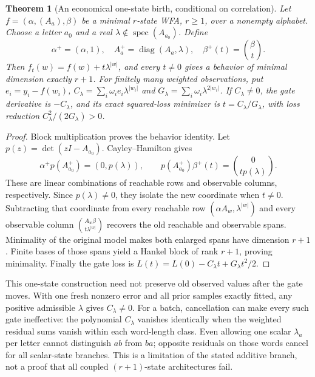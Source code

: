 \documentclass[11pt]{article}
\newtheorem{theorem}{Theorem}[section]
\theoremstyle{definition}
\theoremstyle{remark}
\begin{document}
\begin{theorem}[An economical one-state birth, conditional on correlation]
\label{ce:one-state}
Let $f=(\alpha,(A_a),\beta)$ be a minimal $r$-state WFA, $r\geq1$,
over a nonempty alphabet. Choose a letter $a_0$ and a real
$\lambda\notin\operatorname{spec}(A_{a_0})$. Define
\[
 \alpha^+=(\alpha,1),\quad
 A_a^+=\operatorname{diag}(A_a,\lambda),\quad
 \beta^+(t)=\binom\beta t.
\]
Then $f_t(w)=f(w)+t\lambda^{|w|}$, and every $t\ne0$ gives a behavior
of minimal dimension exactly $r+1$. For finitely many weighted observations,
put $e_i=y_i-f(w_i)$,
$C_\lambda=\sum_i\omega_i e_i\lambda^{|w_i|}$ and
$G_\lambda=\sum_i\omega_i\lambda^{2|w_i|}$. If $C_\lambda\ne0$,
the gate derivative is $-C_\lambda$, and its exact squared-loss minimizer
is $t=C_\lambda/G_\lambda$, with loss reduction
$C_\lambda^2/(2G_\lambda)>0$.
\end{theorem}
\begin{proof}
Block multiplication proves the behavior identity. Let
$p(z)=\det(zI-A_{a_0})$. Cayley--Hamilton gives
\[
 \alpha^+p(A_{a_0}^+)=(0,p(\lambda)),\qquad
 p(A_{a_0}^+)\beta^+(t)=\binom0{t p(\lambda)}.
\]
These are linear combinations of reachable rows and observable columns,
respectively. Since $p(\lambda)\ne0$, they isolate the new coordinate
when $t\ne0$. Subtracting that coordinate from every reachable row
$(\alpha A_w,\lambda^{|w|})$ and every observable column
$\binom{A_w\beta}{t\lambda^{|w|}}$ recovers the old reachable and observable
spans. Minimality of the original model makes both enlarged spans have
dimension $r+1$. Finite bases of those spans yield a Hankel block of rank
$r+1$, proving minimality. Finally the gate loss is
$L(t)=L(0)-C_\lambda t+G_\lambda t^2/2$.
\end{proof}

This one-state construction need not preserve old observed values after
the gate moves. With one fresh nonzero error and all prior samples exactly
fitted, any positive admissible $\lambda$ gives $C_\lambda\ne0$.
For a batch, cancellation can make every such gate ineffective: the
polynomial $C_\lambda$ vanishes identically when the weighted residual
sums vanish within each word-length class. Even allowing one scalar
$\lambda_a$ per letter cannot distinguish $ab$ from $ba$; opposite
residuals on those words cancel for all scalar-state branches. This is a
limitation of the stated additive branch, not a proof that all coupled
$(r+1)$-state architectures fail.
\end{document}
